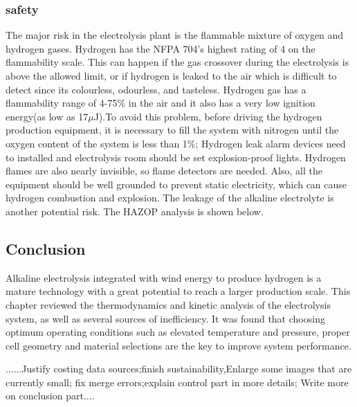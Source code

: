 \subsubsection{safety}
The major risk in the electrolysis plant is the flammable mixture of oxygen and hydrogen gases.
Hydrogen has the NFPA 704's highest rating of 4 on the flammability scale. \cite{safety} This can happen if the gas crossover during the electrolysis is above the allowed limit, or if hydrogen is leaked to the air which is difficult to detect since its colourless, odourless, and tasteless. Hydrogen gas has a flammability range of 4-75\% in the air and it also has a very low ignition energy(as low as 17$\mu$J).To avoid this problem, 
before driving the hydrogen production equipment, it is necessary to fill the system with nitrogen until the oxygen content of the system is less than 1\%; Hydrogen leak alarm devices need to installed and electrolysis room should be set explosion-proof lights. Hydrogen flames are also nearly invisible, so flame detectors are needed. Also, all the equipment should be well grounded to prevent static electricity, which can cause hydrogen combustion and explosion. The leakage of the alkaline electrolyte is another potential risk. The HAZOP analysis is shown below.




\subsection{Conclusion} 
Alkaline electrolysis integrated with wind energy to produce hydrogen is a mature technology with a great potential to reach a larger production scale. 
This chapter reviewed the thermodynamics and kinetic analysis of the electrolysis system, as well as several sources of inefficiency. It was found that choosing optimum operating conditions such as elevated temperature and pressure, proper cell geometry and material selections are the key to improve system performance. 

......Justify costing data sources;finish sustainability,Enlarge some images that are currently small; fix merge errors;explain control part in more details; Write more on conclusion part....

